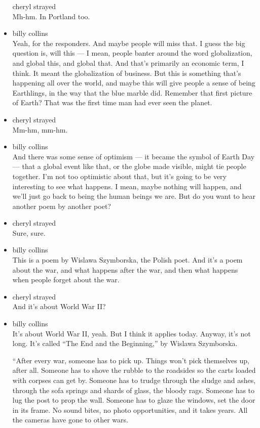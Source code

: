 \begin{itemize}
  cheryl strayed\\
  Mh-hm. In Portland too.
\item
  billy collins\\
  Yeah, for the responders. And maybe people will miss that. I guess the
  big question is, will this --- I mean, people banter around the word
  globalization, and global this, and global that. And that's primarily
  an economic term, I think. It meant the globalization of business. But
  this is something that's happening all over the world, and maybe this
  will give people a sense of being Earthlings, in the way that the blue
  marble did. Remember that first picture of Earth? That was the first
  time man had ever seen the planet.
\item
  cheryl strayed\\
  Mm-hm, mm-hm.
\item
  billy collins\\
  And there was some sense of optimism --- it became the symbol of Earth
  Day --- that a global event like that, or the globe made visible,
  might tie people together. I'm not too optimistic about that, but it's
  going to be very interesting to see what happens. I mean, maybe
  nothing will happen, and we'll just go back to being the human beings
  we are. But do you want to hear another poem by another poet?
\item
  cheryl strayed\\
  Sure, sure.
\item
  billy collins\\
  This is a poem by Wislawa Szymborska, the Polish poet. And it's a poem
  about the war, and what happens after the war, and then what happens
  when people forget about the war.
\item
  cheryl strayed\\
  And it's about World War II?
\item
  billy collins\\
  It's about World War II, yeah. But I think it applies today. Anyway,
  it's not long. It's called ``The End and the Beginning,'' by Wislawa
  Szymborska.

  ``After every war, someone has to pick up. Things won't pick
  themselves up, after all. Someone has to shove the rubble to the
  roadsides so the carts loaded with corpses can get by. Someone has to
  trudge through the sludge and ashes, through the sofa springs and
  shards of glass, the bloody rags. Someone has to lug the post to prop
  the wall. Someone has to glaze the windows, set the door in its frame.
  No sound bites, no photo opportunities, and it takes years. All the
  cameras have gone to other wars.


\end{itemize}
